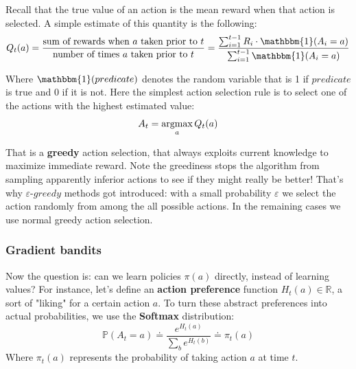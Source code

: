 Recall that the true value of an action is the mean reward when that action is selected. A simple estimate of this quantity is the following:
\[  
    Q_t(a) = \frac{\text{sum of rewards when $a$ taken prior to $t$}}{\text{number of times $a$ taken prior to $t$}} = \frac{\sum_{i=1}^{t-1} R_i \cdot \mathbbm{1}(A_i=a)}{\sum_{i=1}^{t-1} \mathbbm{1}({A_i=a})}
\]

Where $\mathbbm{1}(predicate)$ denotes the random variable that is 1 if $predicate$ is true and 0 if it is not. Here the simplest action selection rule is to select one of the actions with the highest estimated value:
\[
    A_t = \operatorname*{argmax}_{a} Q_t(a)
\]

That is a \textbf{greedy} action selection, that always exploits current knowledge to maximize immediate reward. Note the greediness stops the algorithm from sampling apparently inferior actions to see if they might really be better! That's why $\varepsilon$-$greedy$ methods got introduced: with a small probability $\varepsilon$ we select the action randomly from among the all possible actions. In the remaining cases we use normal greedy action selection.

\subsubsection{Gradient bandits}
Now the question is: can we learn policies $\pi(a)$ directly, instead of learning values? For instance, let's define an \textbf{action preference} function $H_t(a) \in \mathbb{R}$, a sort of "liking" for a certain action $a$. To turn these abstract preferences into actual probabilities, we use the \textbf{Softmax} distribution:
\[
    \mathbb{P}(A_t=a) \doteq \frac{e^{H_t(a)}}{\sum_{b} e^{H_t(b)}} \doteq \pi_t(a)
\]
Where $\pi_t(a)$ represents the probability of taking action $a$ at time $t$.

